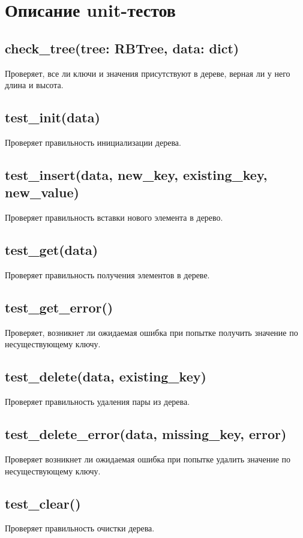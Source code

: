 \section{Описание unit-тестов}

\subsection*{check\_tree(tree: RBTree, data: dict)}

Проверяет, все ли ключи и значения
присутствуют в дереве, верная
ли у него длина и высота.

\subsection*{test\_init(data)}

Проверяет правильность инициализации
дерева.

\subsection*{test\_insert(data, new\_key, existing\_key, new\_value)}

Проверяет правильность вставки нового
элемента в дерево.

\subsection*{test\_get(data)}

Проверяет правильность получения
элементов в дереве.

\subsection*{test\_get\_error()}

Проверяет, возникнет ли ожидаемая
ошибка при попытке получить значение
по несуществующему ключу.

\subsection*{test\_delete(data, existing\_key)}

Проверяет правильность удаления
пары из дерева.

\subsection*{test\_delete\_error(data, missing\_key, error)}

Проверяет возникнет ли ожидаемая
ошибка при попытке удалить значение
по несуществующему ключу.

\subsection*{test\_clear()}

Проверяет правильность очистки дерева.
